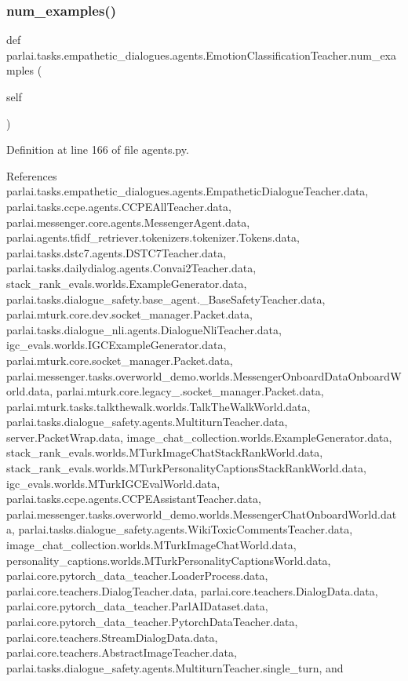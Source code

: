 \subsubsection{\texorpdfstring{num\+\_\+examples()}{num\_examples()}}
{\footnotesize\ttfamily def parlai.\+tasks.\+empathetic\+\_\+dialogues.\+agents.\+Emotion\+Classification\+Teacher.\+num\+\_\+examples (\begin{DoxyParamCaption}\item[{}]{self }\end{DoxyParamCaption})}



Definition at line 166 of file agents.\+py.



References parlai.\+tasks.\+empathetic\+\_\+dialogues.\+agents.\+Empathetic\+Dialogue\+Teacher.\+data, parlai.\+tasks.\+ccpe.\+agents.\+C\+C\+P\+E\+All\+Teacher.\+data, parlai.\+messenger.\+core.\+agents.\+Messenger\+Agent.\+data, parlai.\+agents.\+tfidf\+\_\+retriever.\+tokenizers.\+tokenizer.\+Tokens.\+data, parlai.\+tasks.\+dstc7.\+agents.\+D\+S\+T\+C7\+Teacher.\+data, parlai.\+tasks.\+dailydialog.\+agents.\+Convai2\+Teacher.\+data, stack\+\_\+rank\+\_\+evals.\+worlds.\+Example\+Generator.\+data, parlai.\+tasks.\+dialogue\+\_\+safety.\+base\+\_\+agent.\+\_\+\+Base\+Safety\+Teacher.\+data, parlai.\+mturk.\+core.\+dev.\+socket\+\_\+manager.\+Packet.\+data, parlai.\+tasks.\+dialogue\+\_\+nli.\+agents.\+Dialogue\+Nli\+Teacher.\+data, igc\+\_\+evals.\+worlds.\+I\+G\+C\+Example\+Generator.\+data, parlai.\+mturk.\+core.\+socket\+\_\+manager.\+Packet.\+data, parlai.\+messenger.\+tasks.\+overworld\+\_\+demo.\+worlds.\+Messenger\+Onboard\+Data\+Onboard\+World.\+data, parlai.\+mturk.\+core.\+legacy\+\_.\+socket\+\_\+manager.\+Packet.\+data, parlai.\+mturk.\+tasks.\+talkthewalk.\+worlds.\+Talk\+The\+Walk\+World.\+data, parlai.\+tasks.\+dialogue\+\_\+safety.\+agents.\+Multiturn\+Teacher.\+data, server.\+Packet\+Wrap.\+data, image\+\_\+chat\+\_\+collection.\+worlds.\+Example\+Generator.\+data, stack\+\_\+rank\+\_\+evals.\+worlds.\+M\+Turk\+Image\+Chat\+Stack\+Rank\+World.\+data, stack\+\_\+rank\+\_\+evals.\+worlds.\+M\+Turk\+Personality\+Captions\+Stack\+Rank\+World.\+data, igc\+\_\+evals.\+worlds.\+M\+Turk\+I\+G\+C\+Eval\+World.\+data, parlai.\+tasks.\+ccpe.\+agents.\+C\+C\+P\+E\+Assistant\+Teacher.\+data, parlai.\+messenger.\+tasks.\+overworld\+\_\+demo.\+worlds.\+Messenger\+Chat\+Onboard\+World.\+data, parlai.\+tasks.\+dialogue\+\_\+safety.\+agents.\+Wiki\+Toxic\+Comments\+Teacher.\+data, image\+\_\+chat\+\_\+collection.\+worlds.\+M\+Turk\+Image\+Chat\+World.\+data, personality\+\_\+captions.\+worlds.\+M\+Turk\+Personality\+Captions\+World.\+data, parlai.\+core.\+pytorch\+\_\+data\+\_\+teacher.\+Loader\+Process.\+data, parlai.\+core.\+teachers.\+Dialog\+Teacher.\+data, parlai.\+core.\+teachers.\+Dialog\+Data.\+data, parlai.\+core.\+pytorch\+\_\+data\+\_\+teacher.\+Parl\+A\+I\+Dataset.\+data, parlai.\+core.\+pytorch\+\_\+data\+\_\+teacher.\+Pytorch\+Data\+Teacher.\+data, parlai.\+core.\+teachers.\+Stream\+Dialog\+Data.\+data, parlai.\+core.\+teachers.\+Abstract\+Image\+Teacher.\+data, parlai.\+tasks.\+dialogue\+\_\+safety.\+agents.\+Multiturn\+Teacher.\+single\+\_\+turn, and 